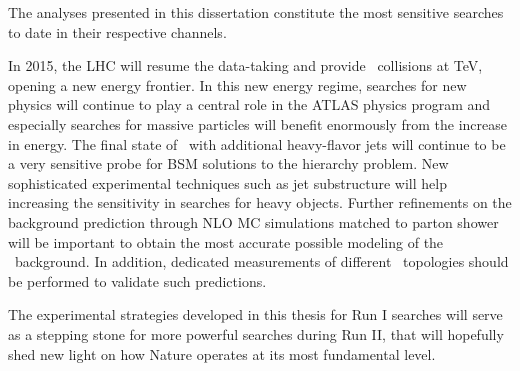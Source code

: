 The analyses presented in this dissertation constitute the most sensitive searches to date in their respective channels.

In 2015, the LHC will resume the data-taking and provide \pp\ collisions at \unit[13]{\TeV}, opening a new energy frontier. In this new energy regime, searches for new physics will continue to play a central role in the ATLAS physics program and especially searches for massive particles will benefit enormously from the increase in energy. 
The final state of \ttbar\ with additional heavy-flavor jets will continue to be a very sensitive probe for BSM solutions to the hierarchy problem. New sophisticated experimental techniques such as jet substructure will help increasing the sensitivity in searches for heavy objects.
Further refinements on the background prediction through NLO MC simulations matched to parton shower will be important to obtain the most accurate possible modeling of the \ttHF\ background. In addition, dedicated measurements of different \ttHF\ topologies should be performed to validate such predictions.

The experimental strategies developed in this thesis for Run I searches will serve as a stepping stone for more powerful searches during Run II, that will hopefully shed new light on how Nature operates at its most fundamental level.
